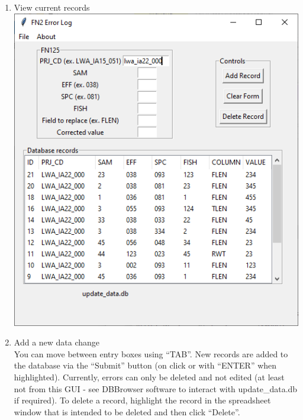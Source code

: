 \documentclass[
]{book}
\begin{document}
\begin{enumerate}
\item
  View current records\\
  \includegraphics{Figures/DataChangeDB_03.png}
\item
  Add a new data change\\
  You can move between entry boxes using ``TAB''. New records are added to the database via the ``Submit'' button (on click or with ``ENTER'' when highlighted). Currently, errors can only be deleted and not edited (at least not from this GUI - see DBBrowser software to interact with update\_data.db if required). To delete a record, highlight the record in the spreadsheet window that is intended to be deleted and then click ``Delete''.\\

\end{enumerate}
\end{document}
